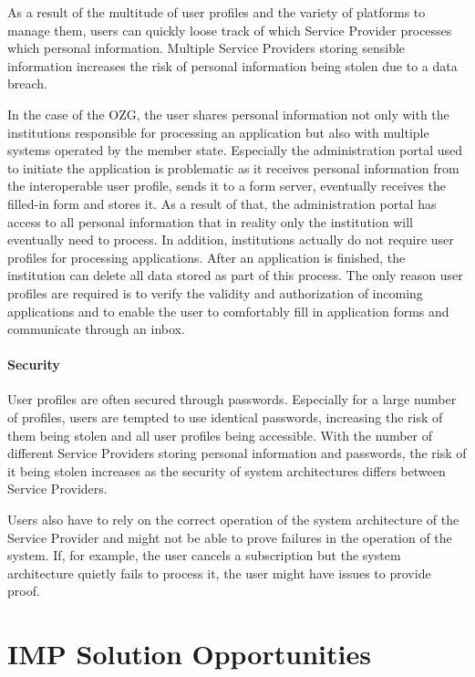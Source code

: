 As a result of the multitude of user profiles and the variety of platforms to manage them, users can quickly loose track of which Service Provider processes which personal information. Multiple Service Providers storing sensible information increases the risk of personal information being stolen due to a data breach.


In the case of the OZG, the user shares personal information not only with the institutions responsible for processing an application but also with multiple systems operated by the member state. Especially the administration portal used to initiate the application is problematic as it receives personal information from the interoperable user profile, sends it to a form server, eventually receives the filled-in form and stores it. As a result of that, the administration portal has access to all personal information that in reality only the institution will eventually need to process. In addition, institutions actually do not require user profiles for processing applications. After an application is finished, the institution can delete all data stored as part of this process. The only reason user profiles are required is to verify the validity and authorization of incoming applications and to enable the user to comfortably fill in application forms and communicate through an inbox. 

\paragraph{Security}

User profiles are often secured through passwords. Especially for a large number of profiles, users are tempted to use identical passwords, increasing the risk of them being stolen and all user profiles being accessible. With the number of different Service Providers storing personal information and passwords, the risk of it being stolen increases as the security of system architectures differs between Service Providers.

Users also have to rely on the correct operation of the system architecture of the Service Provider and might not be able to prove failures in the operation of the system. If, for example, the user cancels a subscription but the system architecture quietly fails to process it, the user might have issues to provide proof.


\section{IMP Solution Opportunities} \label{section:imp_solution_opportunities}

